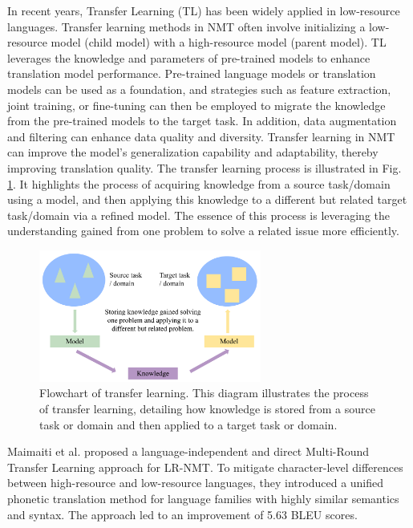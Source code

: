 \documentclass[acmsmall]{acmart}
\begin{document}
In recent years, Transfer Learning (TL) has been widely applied in low-resource languages. Transfer learning methods in NMT often involve initializing a low-resource model (child model) with a high-resource model (parent model).  TL leverages the knowledge and parameters of pre-trained models to enhance translation model performance. Pre-trained language models or translation models can be used as a foundation, and strategies such as feature extraction, joint training, or fine-tuning can then be employed to migrate the knowledge from the pre-trained models to the target task. In addition, data augmentation and filtering can enhance data quality and diversity. Transfer learning in NMT can improve the model's generalization capability and adaptability, thereby improving translation quality. The transfer learning process is illustrated in Fig. \ref{fig:four}. It highlights the process of acquiring knowledge from a source task/domain using a model, and then applying this knowledge to a different but related target task/domain via a refined model. The essence of this process is leveraging the understanding gained from one problem to solve a related issue more efficiently.

\begin{figure}
\centering
\includegraphics[width=0.65\textwidth]{Transferlearning.pdf} 
\caption{Flowchart of transfer learning. This diagram illustrates the process of transfer learning, detailing how knowledge is stored from a source task or domain and then applied to a target task or domain.} 
\label{fig:four} 
\end{figure}


Maimaiti et al. proposed a language-independent and direct Multi-Round Transfer Learning approach for LR-NMT\cite{n4-57}. To mitigate character-level differences between high-resource and low-resource languages, they introduced a unified phonetic translation method for language families with highly similar semantics and syntax. The approach led to an improvement of 5.63 BLEU scores. 
\end{document}
